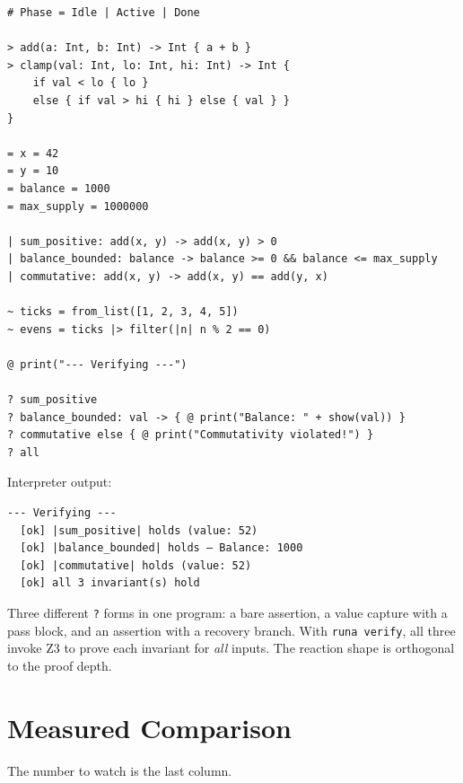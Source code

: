 \documentclass[11pt,a4paper]{article}
\begin{document}
\begin{lstlisting}
# Phase = Idle | Active | Done

> add(a: Int, b: Int) -> Int { a + b }
> clamp(val: Int, lo: Int, hi: Int) -> Int {
    if val < lo { lo }
    else { if val > hi { hi } else { val } }
}

= x = 42
= y = 10
= balance = 1000
= max_supply = 1000000

| sum_positive: add(x, y) -> add(x, y) > 0
| balance_bounded: balance -> balance >= 0 && balance <= max_supply
| commutative: add(x, y) -> add(x, y) == add(y, x)

~ ticks = from_list([1, 2, 3, 4, 5])
~ evens = ticks |> filter(|n| n % 2 == 0)

@ print("--- Verifying ---")

? sum_positive
? balance_bounded: val -> { @ print("Balance: " + show(val)) }
? commutative else { @ print("Commutativity violated!") }
? all
\end{lstlisting}

\noindent Interpreter output:
\begin{verbatim}
--- Verifying ---
  [ok] |sum_positive| holds (value: 52)
  [ok] |balance_bounded| holds — Balance: 1000
  [ok] |commutative| holds (value: 52)
  [ok] all 3 invariant(s) hold
\end{verbatim}

Three different \texttt{?} forms in one program: a bare assertion, a value capture with a pass block, and an assertion with a recovery branch. With \texttt{runa verify}, all three invoke Z3 to prove each invariant for \emph{all} inputs. The reaction shape is orthogonal to the proof depth.

\section{Measured Comparison}

The number to watch is the last column.
\end{document}

